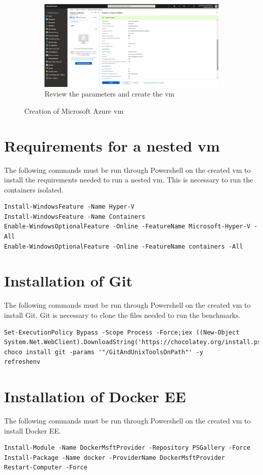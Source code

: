 \begin{figure}[h]\ContinuedFloat
	\begin{subfigure}{\textwidth}
		\captionsetup{width=0.9\linewidth}
		\includegraphics[width=\linewidth]{img/Methodologie/Containers7.png}
		\centering
		\caption{Review the parameters and create the \acrshort{vm}}
	\end{subfigure}
	\caption[Azure \acrshort{vm} creation]{Creation of Microsoft Azure \acrshort{vm}}
	\label{fig:Container_VM}
\end{figure}
\clearpage
\section{Requirements for a nested \acrshort{vm}}
The following commands must be run through Powershell on the created \acrshort{vm} to install the requirements needed to run a nested \acrshort{vm}. This is necessary to run the containers isolated.
\begin{lstlisting}[breaklines]
Install-WindowsFeature -Name Hyper-V
Install-WindowsFeature -Name Containers
Enable-WindowsOptionalFeature -Online -FeatureName Microsoft-Hyper-V -All
Enable-WindowsOptionalFeature -Online -FeatureName containers -All
\end{lstlisting}
\section{Installation of Git}
The following commands must be run through Powershell on the created \acrshort{vm} to install Git. Git is necessary to clone the files needed to run the benchmarks.
\begin{lstlisting}[breaklines]
Set-ExecutionPolicy Bypass -Scope Process -Force;iex ((New-Object System.Net.WebClient).DownloadString('https://chocolatey.org/install.ps1'))
choco install git -params '"/GitAndUnixToolsOnPath"' -y
refreshenv
\end{lstlisting}
\section{Installation of Docker EE}
The following commands must be run through Powershell on the created \acrshort{vm} to install Docker EE.
\begin{lstlisting}[breaklines]
Install-Module -Name DockerMsftProvider -Repository PSGallery -Force
Install-Package -Name docker -ProviderName DockerMsftProvider
Restart-Computer -Force
\end{lstlisting}